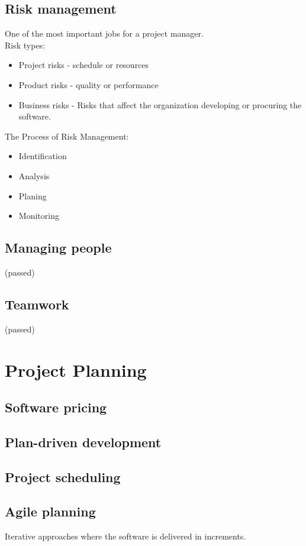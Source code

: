 \documentclass[a4paper,11pt,twocolumn]{report}
\begin{document}
    \section{Risk management}
    One of the most important jobs for a project manager.\\
    Risk types:
    \begin{itemize}
        \item Project risks - schedule or resources
        \item Product risks - quality or performance
        \item Business risks - Risks that affect the organization developing or
            procuring the software.
    \end{itemize}
    The Process of Risk Management:
    \begin{itemize}
        \item Identification
        \item Analysis
        \item Planing
        \item Monitoring
    \end{itemize}
    \section{Managing people}(passed)
    \section{Teamwork}(passed)

    \chapter{Project Planning}
    \section{Software pricing}
    \section{Plan-driven development}
    \section{Project scheduling}
    \section{Agile planning}
    Iterative approaches where the software is delivered in increments.
\end{document}
